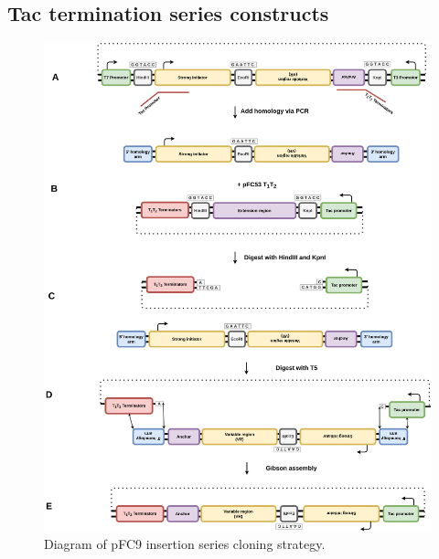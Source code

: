 \documentclass[11pt]{article}
\begin{document}
\subsection{Tac termination series constructs}
\label{sec:tac-termination}


\begin{figure}[H]
	\includegraphics[width=15cm]{images/cloning_diagrams/construct_diagrams-Tac-termination-series.png}
	\centering
	\caption{Diagram of pFC9 insertion series cloning strategy.}
\end{figure}
\end{document}

